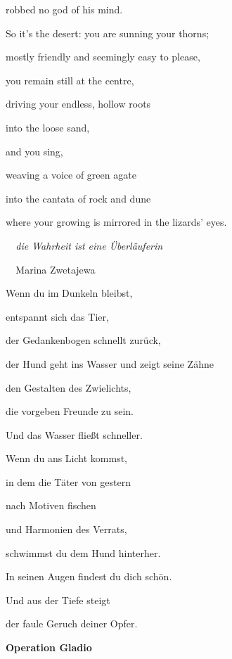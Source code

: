 robbed no god of his mind.


\bigskip

So it's the desert: you are sunning your thorns;

mostly friendly and seemingly easy to please,

you remain still at the centre, 

driving your endless, hollow roots

into the loose sand,

and you sing,

weaving a voice of green agate 

into the cantata of rock and dune

where your growing is mirrored in the lizards' eyes.


\bigskip



\bigskip

\emph{
\ \ die Wahrheit ist eine Überläuferin}

\emph{\ \ }Marina Zwetajewa


\bigskip


\bigskip

Wenn du im Dunkeln bleibst,

entspannt sich das Tier,

der Gedankenbogen schnellt zurück,

der Hund geht ins Wasser und zeigt seine Zähne 

den Gestalten des Zwielichts, \ 

die vorgeben Freunde zu sein.


\bigskip

Und das Wasser fließt schneller.


\bigskip

Wenn du ans Licht kommst,

in dem die Täter von gestern

nach Motiven fischen

und Harmonien des Verrats,

schwimmst du dem Hund hinterher.

In seinen Augen findest du dich schön.


\bigskip

Und aus der Tiefe steigt 

der faule Geruch deiner Opfer.

\clearpage
\bigskip

{\bfseries
Operation Gladio}


